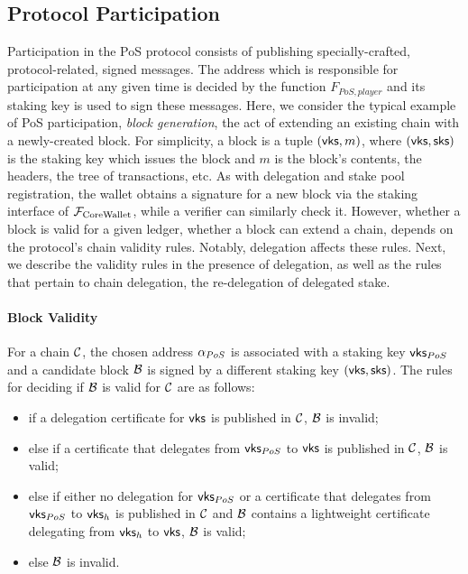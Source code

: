 \subsection{Protocol Participation}\label{sec:protocol-participation}

Participation in the PoS protocol consists of publishing specially-crafted,
protocol-related, signed messages. The address which is responsible for
participation at any given time is decided by the function $F_{PoS,player}$ and
its staking key is used to sign these messages. Here, we consider the typical
example of PoS participation, \emph{block generation}, \ie the act of extending
an existing chain with a newly-created block. For simplicity, a block is a
tuple $(\mathsf{vks}, m)$, where $(\mathsf{vks}, \mathsf{sks})$ is the staking key
which issues the block and $m$ is the block's contents, \ie the headers, the
tree of transactions, etc. As with delegation and stake pool registration, the
wallet obtains a signature for a new block via the staking interface of
$\mathcal{F}_\mathrm{CoreWallet}$, while a verifier can similarly check it. However, whether a block is
valid for a given ledger, \ie whether a block can extend a chain, depends on
the protocol's chain validity rules. Notably, delegation affects these rules.
Next, we describe the validity rules in the presence of delegation, as well as
the rules that pertain to chain delegation, \ie the re-delegation of delegated
stake.

\paragraph{Block Validity}
For a chain $\mathcal{C}$, the chosen address $\alpha_{PoS}$ is associated with a
staking key $\mathsf{vks}_{PoS}$ and a candidate block $\mathcal{B}$ is signed
by a different staking key $(\mathsf{vks}, \mathsf{sks})$. The rules for deciding if
$\mathcal{B}$ is valid for $\mathcal{C}$ are as follows:
\begin{itemize}
    \item if a delegation certificate for $\mathsf{vks}$ is published in
        $\mathcal{C}$, $\mathcal{B}$ is invalid;
    \item else if a certificate that delegates from $\mathsf{vks}_{PoS}$
        to $\mathsf{vks}$ is published in $\mathcal{C}$, $\mathcal{B}$ is valid;
    \item else if either no delegation for $\mathsf{vks}_{PoS}$ or a
        certificate that delegates from $\mathsf{vks}_{PoS}$ to
        $\mathsf{vks}_h$ is published in $\mathcal{C}$ and $\mathcal{B}$ contains a
        lightweight certificate delegating from $\mathsf{vks}_h$ to
        $\mathsf{vks}$, $\mathcal{B}$ is valid;
    \item else $\mathcal{B}$ is invalid.
\end{itemize}

